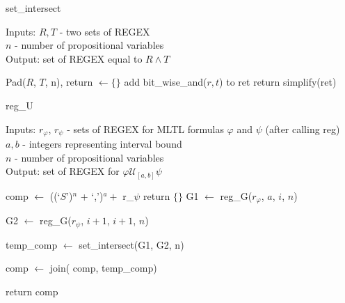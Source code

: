 \documentclass[runningheads]{llncs}
\renewcommand{\phi}{\varphi}
\begin{document}
\begin{minipage}[h]{0.48\textwidth}
\begin{algorithm}[H]
\caption{set\_intersect}
Inputs: $R, T$ - two sets of REGEX\\
$n$ - number of propositional variables\\
Output: set of REGEX equal to $R \land T$
\begin{algorithmic}[1]
    \State Pad($R$, $T$, n), return $\leftarrow \{\}$
            \State add bit\_wise\_and($r, t$) to ret 
    \EndFor
    \State return simplify(ret)
\EndProcedure
\end{algorithmic}
\end{algorithm}
\begin{algorithm}[H]
\caption{reg\_U} 
Inputs: $r_\phi$, $r_\psi$ - sets of REGEX for MLTL formulas $\phi$ and $\psi$ (after calling reg)\\
$a, b$ - integers representing interval bound \\
$n$ - number of propositional variables\\
Output: set of REGEX for $\phi \mathcal{U}_{[a, b]} \psi$
\begin{algorithmic}[1]
\Procedure{reg\_U}{$r_\phi$, $r_\psi$, $a$, $b$, $n$} 
    \State comp $\leftarrow$ ((`$S$')$^{n}$ + `,')$^{a} + $ r\_$\psi$
     return $\{\}$
    \EndIf
        \State G1 $\leftarrow$ reg\_G($r_\phi$, $a$, $i$, $n$)
        \State \parbox[t]{.8\linewidth}{G2 $\leftarrow$ reg\_G($r_\psi$, $i+1$, $i+1$, $n$)}
        \State \parbox[t]{.8\linewidth}{temp\_comp $\leftarrow$ set\_intersect(G1,  \hspace*{5mm}G2, n)}
        \State \parbox[t]{.8\linewidth}{comp $\leftarrow$ join( comp, temp\_comp)}
    \EndFor
    \State return comp
\EndProcedure
\end{algorithmic}
\end{algorithm}
\end{minipage}




\end{document}

